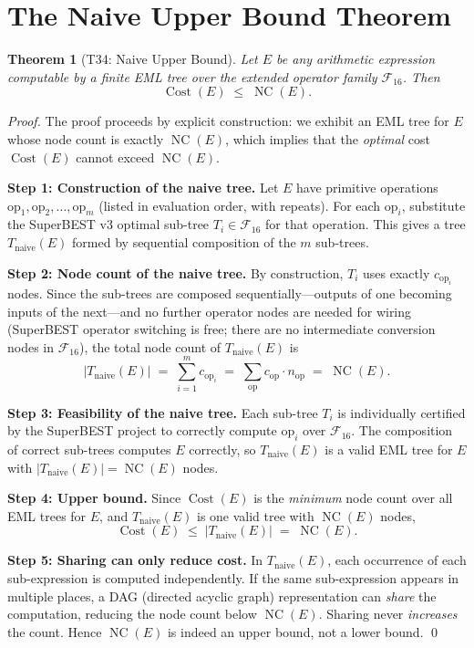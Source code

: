 \documentclass[12pt,a4paper]{article}
\newtheorem{theorem}{Theorem}[section]
\theoremstyle{definition}
\newcommand{\NC}{\operatorname{NC}}
\newcommand{\Cost}{\operatorname{Cost}}
\begin{document}
\section{The Naive Upper Bound Theorem}
\label{sec:theorem}

\begin{theorem}[T34: Naive Upper Bound]
\label{thm:T34}
Let $E$ be any arithmetic expression computable by a finite EML tree
over the extended operator family $\mathcal{F}_{16}$.
Then
\[
  \boxed{\Cost(E) \;\leq\; \NC(E).}
\]
\end{theorem}

\begin{proof}
The proof proceeds by explicit construction: we exhibit an EML tree for $E$
whose node count is exactly $\NC(E)$, which implies that the \emph{optimal}
cost $\Cost(E)$ cannot exceed $\NC(E)$.

\medskip
\noindent\textbf{Step 1: Construction of the naive tree.}
Let $E$ have primitive operations $\mathrm{op}_1, \mathrm{op}_2, \ldots, \mathrm{op}_m$
(listed in evaluation order, with repeats).
For each $\mathrm{op}_i$, substitute the SuperBEST v3 optimal sub-tree
$T_i \in \mathcal{F}_{16}$ for that operation.
This gives a tree $T_{\mathrm{naive}}(E)$ formed by sequential composition
of the $m$ sub-trees.

\medskip
\noindent\textbf{Step 2: Node count of the naive tree.}
By construction, $T_i$ uses exactly $c_{\mathrm{op}_i}$ nodes.
Since the sub-trees are composed sequentially---outputs of one becoming
inputs of the next---and no further operator nodes are needed for
wiring (SuperBEST operator switching is free; there are no intermediate
conversion nodes in $\mathcal{F}_{16}$), the total node count of
$T_{\mathrm{naive}}(E)$ is
\[
  |T_{\mathrm{naive}}(E)| \;=\; \sum_{i=1}^{m} c_{\mathrm{op}_i}
  \;=\; \sum_{\mathrm{op}} c_{\mathrm{op}} \cdot n_{\mathrm{op}}
  \;=\; \NC(E).
\]

\medskip
\noindent\textbf{Step 3: Feasibility of the naive tree.}
Each sub-tree $T_i$ is individually certified by the SuperBEST project to
correctly compute $\mathrm{op}_i$ over $\mathcal{F}_{16}$.
The composition of correct sub-trees computes $E$ correctly, so
$T_{\mathrm{naive}}(E)$ is a valid EML tree for $E$ with
$|T_{\mathrm{naive}}(E)| = \NC(E)$ nodes.

\medskip
\noindent\textbf{Step 4: Upper bound.}
Since $\Cost(E)$ is the \emph{minimum} node count over all EML trees for $E$,
and $T_{\mathrm{naive}}(E)$ is one valid tree with $\NC(E)$ nodes,
\[
  \Cost(E) \;\leq\; |T_{\mathrm{naive}}(E)| \;=\; \NC(E).
\]

\medskip
\noindent\textbf{Step 5: Sharing can only reduce cost.}
In $T_{\mathrm{naive}}(E)$, each occurrence of each sub-expression is
computed independently.
If the same sub-expression appears in multiple places, a DAG
(directed acyclic graph) representation can \emph{share} the computation,
reducing the node count below $\NC(E)$.
Sharing never \emph{increases} the count.
Hence $\NC(E)$ is indeed an upper bound, not a lower bound. \qed
\end{proof}
\end{document}
